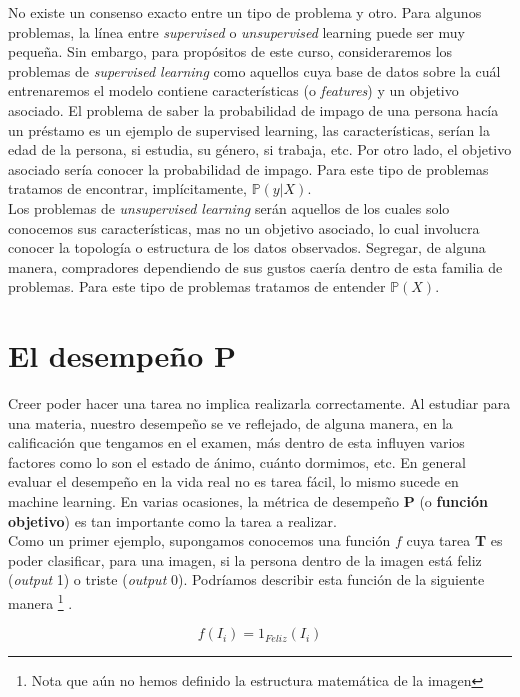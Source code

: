 \documentclass[11pt]{article}
\begin{document}
No existe un consenso exacto entre un tipo de problema y otro. Para algunos problemas, la línea entre \textit{supervised} o \textit{unsupervised} learning puede ser muy pequeña. Sin embargo, para propósitos de este curso, consideraremos los problemas de \textit{supervised learning} como aquellos cuya base de datos sobre la cuál entrenaremos el modelo contiene características (o \textit{features}) y un objetivo asociado. El problema de saber la probabilidad de impago de una persona hacía un préstamo es un ejemplo de supervised learning, las características, serían la edad de la persona, si estudia, su género, si trabaja, etc. Por otro lado, el objetivo asociado sería conocer la probabilidad de impago. Para este tipo de problemas tratamos de encontrar, implícitamente, $\mathbb{P}(y|X)$.\\

Los problemas de \textit{unsupervised learning} serán aquellos de los cuales solo conocemos sus características, mas no un objetivo asociado, lo cual involucra conocer la topología o estructura de los datos observados. Segregar, de alguna manera, compradores dependiendo de sus gustos caería dentro de esta familia de problemas. Para este tipo de problemas tratamos de entender $\mathbb{P}(X)$.



\section{El desempeño \textbf{P}}
Creer poder hacer una tarea no implica realizarla correctamente. Al estudiar para una materia, nuestro desempeño se ve reflejado, de alguna manera, en la calificación que tengamos en el examen, más dentro de esta influyen varios factores como lo son el estado de ánimo, cuánto dormimos, etc. En general evaluar el desempeño en la vida real no es tarea fácil, lo mismo sucede en machine learning. En varias ocasiones, la métrica de desempeño \textbf{P} (o \textbf{función objetivo}) es tan importante como la tarea a realizar.\\

Como un primer ejemplo, supongamos conocemos una función $f$ cuya tarea \textbf{T} es poder clasificar, para una imagen, si la persona dentro de la imagen está feliz (\textit{output} 1) o triste (\textit{output} 0). Podríamos describir esta función de la siguiente manera \footnote{Nota que aún no hemos definido la estructura matemática de la imagen} .

\begin{equation}
	f(I_i) = 1_{Feliz}(I_i)
\end{equation}
\end{document}

